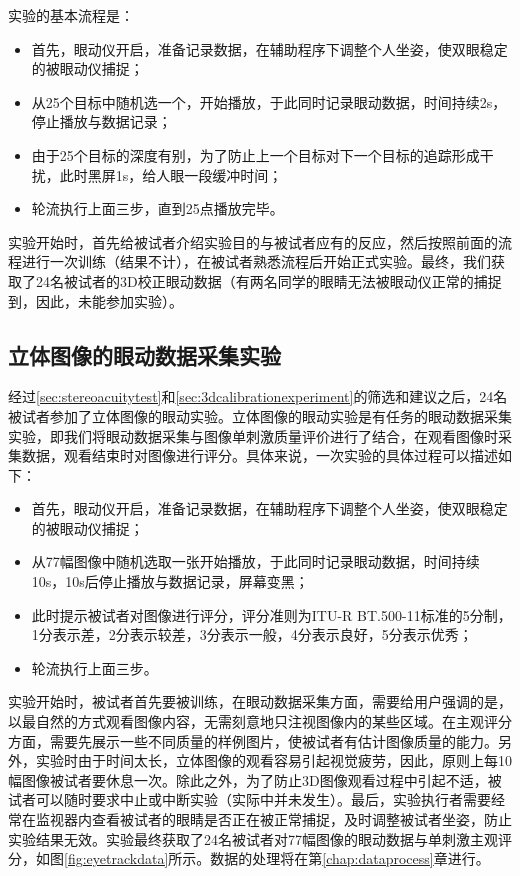 实验的基本流程是：
\begin{itemize}[noitemsep,topsep=0pt,parsep=0pt,partopsep=0pt]
\item 首先，眼动仪开启，准备记录数据，在辅助程序下调整个人坐姿，使双眼稳定的被眼动仪捕捉；
\item 从25个目标中随机选一个，开始播放，于此同时记录眼动数据，时间持续2s，停止播放与数据记录；
\item 由于25个目标的深度有别，为了防止上一个目标对下一个目标的追踪形成干扰，此时黑屏1s，给人眼一段缓冲时间；
\item 轮流执行上面三步，直到25点播放完毕。
\end{itemize}

实验开始时，首先给被试者介绍实验目的与被试者应有的反应，然后按照前面的流程进行一次训练（结果不计），在被试者熟悉流程后开始正式实验。最终，我们获取了24名被试者的3D校正眼动数据（有两名同学的眼睛无法被眼动仪正常的捕捉到，因此，未能参加实验）。
\subsection{立体图像的眼动数据采集实验}
\label{sec:stereoscopicimageeyetrackdatacollecting}
经过\ref{sec:stereoacuitytest}和\ref{sec:3dcalibrationexperiment}的筛选和建议之后，24名被试者参加了立体图像的眼动实验。立体图像的眼动实验是有任务的眼动数据采集实验，即我们将眼动数据采集与图像单刺激质量评价进行了结合，在观看图像时采集数据，观看结束时对图像进行评分。具体来说，一次实验的具体过程可以描述如下：
\begin{itemize}[noitemsep,topsep=0pt,parsep=0pt,partopsep=0pt]
\item 首先，眼动仪开启，准备记录数据，在辅助程序下调整个人坐姿，使双眼稳定的被眼动仪捕捉；
\item 从77幅图像中随机选取一张开始播放，于此同时记录眼动数据，时间持续10s，10s后停止播放与数据记录，屏幕变黑；
\item 此时提示被试者对图像进行评分，评分准则为ITU-R BT.500-11\parencite{recommendation2002500}标准的5分制，1分表示差，2分表示较差，3分表示一般，4分表示良好，5分表示优秀；
\item 轮流执行上面三步。
\end{itemize}

实验开始时，被试者首先要被训练，在眼动数据采集方面，需要给用户强调的是，以最自然的方式观看图像内容，无需刻意地只注视图像内的某些区域。在主观评分方面，需要先展示一些不同质量的样例图片，使被试者有估计图像质量的能力。另外，实验时由于时间太长，立体图像的观看容易引起视觉疲劳，因此，原则上每10幅图像被试者要休息一次。除此之外，为了防止3D图像观看过程中引起不适，被试者可以随时要求中止或中断实验（实际中并未发生）。最后，实验执行者需要经常在监视器内查看被试者的眼睛是否正在被正常捕捉，及时调整被试者坐姿，防止实验结果无效。实验最终获取了24名被试者对77幅图像的眼动数据与单刺激主观评分，如图\ref{fig:eyetrackdata}所示。数据的处理将在第\ref{chap:dataprocess}章进行。
